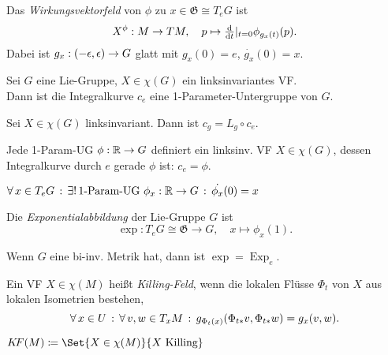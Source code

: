 \documentclass{cheat-sheet}
\DeclareMathOperator{\Exp}{Exp} %
\newcommand{\vinterval}{\ointerval{-\epsilon}{\epsilon}} %
\newcommand{\Gie}{\mathfrak{G}} %
\newcommand{\KF}{K\!F} %
\begin{document}
\begin{defn}
  Das \emph{Wirkungsvektorfeld} von $\phi$ zu $x \in \Gie \cong T_e G$ ist
  \[
    X^\phi : M \to TM, \quad
    p \mapsto \tfrac{\mathrm{d}}{\mathrm{d} t}|_{t=0} \phi_{g_x(t)}(p).
  \]
  Dabei ist $g_x : \vinterval \to G$ glatt mit $g_x(0) = e$, $\dot{g_x}(0) = x$.
\end{defn}


\begin{lem}
  Sei $G$ eine Lie-Gruppe, $X \in \chi(G)$ ein linksinvariantes VF. \\
  Dann ist die Integralkurve $c_e$ eine 1-Parameter-Untergruppe von $G$.
\end{lem}

\begin{lem}
  Sei $X \in \chi(G)$ linksinvariant. Dann ist $c_g = L_g \circ c_e$.
\end{lem}

\begin{lem}
  Jede 1-Param-UG $\phi : \mathbb{R} \to G$ definiert ein linksinv. VF $X \in \chi(G)$, dessen Integralkurve durch $e$ gerade $\phi$ ist: $c_e = \phi$.
\end{lem}

\begin{fazit}
  $\forall \, {x \in T_e G} \,:\, \exists! \, {\text{1-Param-UG } \phi_x : \mathbb{R} \to G} \,:\, \dot{\phi_x}(0) = x$
\end{fazit}

\begin{defn}
  Die \emph{Exponentialabbildung} der Lie-Gruppe $G$ ist
  \[
    \exp : T_e G \cong \Gie \to G, \quad
    x \mapsto \phi_x(1).
  \]
\end{defn}

\begin{bem}
  Wenn $G$ eine bi-inv. Metrik hat, dann ist $\exp = \Exp_e$.
\end{bem}


\begin{defn}
  Ein VF $X \in \chi(M)$ heißt \emph{Killing-Feld}, wenn die lokalen Flüsse $\Phi_t$ von $X$ aus lokalen Isometrien bestehen, \dh{}
  \[
    \forall \, {x \in U} \,:\, \forall \, {v, w \in T_x M} \,:\,
    g_{\Phi_t(x)}(\Phi_{t*} v, \Phi_{t*} w) = g_x(v, w).
  \]
\end{defn}

\begin{nota}
  $\KF(M) \coloneqq \Set{X \in \chi(M)}{X \text{ Killing}}$
\end{nota}
\end{document}
